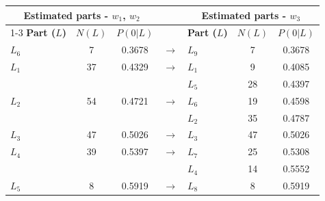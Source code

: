 \begin{tabular*}{\textwidth}{@{\extracolsep\fill}lccclcc@{}}
\toprule
\multicolumn{3}{c}{\textbf{Estimated parts - $w_1$, $w_2$}} & & \multicolumn{3}{c}{\textbf{Estimated parts - $w_3$}} \\ 
\cmidrule{1-3} \cmidrule{5-7} 
\textbf{Part ($L$)} & \textbf{$N(L)$} & \textbf{$P(0 \vert L)$} & & \textbf{Part ($L$)} & \textbf{$N(L)$} & \textbf{$P(0 \vert L)$} \\ 
\midrule
$L_{6}$ & 7 & 0.3678 & $\to$ & $L_{9}$ & 7 & 0.3678 \\ \hline
$L_{1}$ & 37 & 0.4329 & $\to$ & $L_{1}$ & 9 & 0.4085 \\
      &    &        &       & $L_{5}$ & 28 & 0.4397 \\ \hline
$L_{2}$ & 54 & 0.4721 & $\to$ & $L_{6}$ & 19 & 0.4598 \\
      &    &        &       & $L_{2}$ & 35 & 0.4787 \\ \hline
$L_{3}$ & 47 & 0.5026 & $\to$ & $L_{3}$ & 47 & 0.5026 \\ \hline
$L_{4}$ & 39 & 0.5397 & $\to$ & $L_{7}$ & 25 & 0.5308 \\
      &    &        &       & $L_{4}$ & 14 & 0.5552 \\ \hline
$L_{5}$ & 8 & 0.5919 & $\to$ & $L_{8}$ & 8 & 0.5919 \\
\bottomrule
\end{tabular*}
